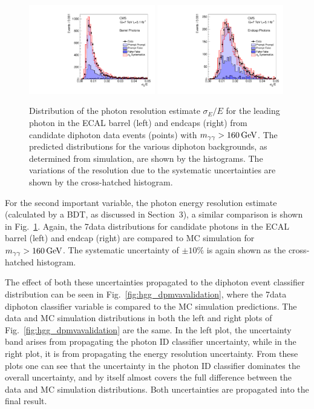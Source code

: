 \documentclass[11pt,twoside,a4paper,cmspaper,final,collab]{cms-tdr}
\begin{document}
\begin{figure}
 \begin{center}
   \includegraphics[width=0.49\textwidth]{figures/hgg_phsige1eb}
   \includegraphics[width=0.49\textwidth]{figures/hgg_phsige1ee}
   \caption{
Distribution of the photon resolution estimate $\sigma_E/E$ for the leading photon in the
ECAL barrel (left) and endcaps (right) from candidate diphoton data
events (points) with $m_{\gamma\gamma}>160\,\text{Ge\hspace{-.08em}V}$.
The predicted distributions for the various diphoton backgrounds, as determined from simulation, are shown by the histograms.
The variations of the resolution due to the systematic uncertainties are shown by the cross-hatched histogram.}
   \label{fig:hgg_sigescale}
 \end{center}
\end{figure}


For the second important variable, the photon energy resolution estimate (calculated by a BDT, as discussed in Section~3),
a similar comparison is shown in Fig.~\ref{fig:hgg_sigescale}. Again, the 7\TeV data distributions for candidate
photons in the ECAL barrel (left) and endcap (right) are compared to MC simulation for $m_{\gamma\gamma}>160\,\text{Ge\hspace{-.08em}V}$.
The systematic uncertainty of ${\pm}10\%$ is again shown as the
cross-hatched histogram.

The effect of both these uncertainties propagated to the diphoton event classifier distribution
can be seen in Fig.~\ref{fig:hgg_dpmvavalidation}, where the 7\TeV data diphoton classifier variable is
compared to the MC simulation predictions. The data and MC simulation distributions in both the left and right plots of
Fig.~\ref{fig:hgg_dpmvavalidation} are the same. In the left plot, the uncertainty band arises from
propagating the photon ID classifier uncertainty, while in the right plot, it is
from propagating the energy resolution uncertainty.
From these plots one can see that the uncertainty in the photon ID classifier dominates the overall uncertainty,
and by itself almost covers the full difference between the data and MC simulation distributions.
Both uncertainties are propagated into the final result.
\end{document}
